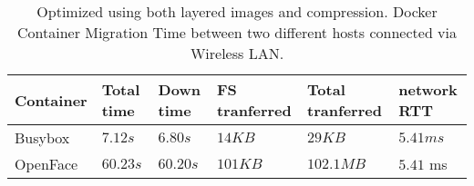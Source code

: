 \begin{table}[!t]
\renewcommand{\arraystretch}{2.5}
\centering

\caption{Optimized using both layered images and compression. Docker Container Migration Time between two different hosts connected via Wireless LAN.}
\label{table_wireless_opt}

\begin{tabular}{|M{1.2cm}|M{0.9cm}|M{0.9cm}|M{1.4cm}|M{1.1cm}|M{0.9cm}|}
\hline
Container & {Total time}  & {Down time} & { FS tranferred} & { Total tranferred } & { network RTT } \\ \hline 
Busybox & $7.12s$ & $6.80s$ & $14KB$ & $29KB$ & $5.41 ms$\\\hline
OpenFace & $60.23s$ & $60.20s$ & $101KB$ & $102.1MB$ & $5.41$ ms\\\hline
\end{tabular}

\end{table}

